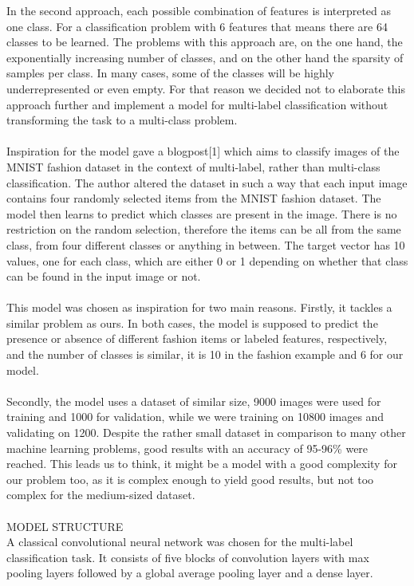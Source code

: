 In the second approach, each possible combination of features is interpreted as one class. For a classification problem with 6 features that means there are 64 classes to be learned. The problems with this approach are, on the one hand, the exponentially increasing number of classes, and on the other hand the sparsity of samples per class. In many cases, some of the classes will be highly underrepresented or even empty. For that reason we decided not to elaborate this approach further and implement a model for multi-label classification without transforming the task to a multi-class problem. \\
\\
Inspiration for the model gave a blogpost[1] which aims to classify images of the MNIST fashion dataset in the context of multi-label, rather than multi-class classification. The author altered the dataset in such a way that each input image contains four randomly selected items from the MNIST fashion dataset. The model then learns to predict which classes are present in the image. There is no restriction on the random selection, therefore the items can be all from the same class, from four different classes or anything in between. The target vector has 10 values, one for each class, which are either 0 or 1 depending on whether that class can be found in the input image or not. \\
\\
This model was chosen as inspiration for two main reasons. Firstly, it tackles a similar problem as ours. In both cases, the model is supposed to predict the presence or absence of different fashion items or labeled features, respectively, and the number of classes is similar, it is 10 in the fashion example and 6 for our model. \\
\\
Secondly, the model uses a dataset of similar size, 9000 images were used for training and 1000 for validation, while we were training on 10800 images and validating on 1200. Despite the rather small dataset in comparison to many other machine learning problems, good results with an accuracy of 95-96\% were reached. This leads us to think, it might be a model with a good complexity for our problem too, as it is complex enough to yield good results, but not too complex for the medium-sized dataset. \\
\\
MODEL STRUCTURE \\
A classical convolutional neural network was chosen for the multi-label classification task. It consists of five blocks of convolution layers with max pooling layers followed by a global average pooling layer and a dense layer. \\
